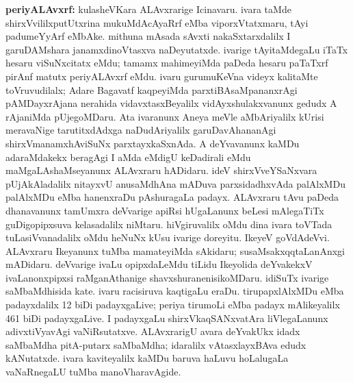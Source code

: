 {\large\textbf{periyALAvxrf:}} kulasheVKara ALAvxrarige Icinavaru. ivara taMde shirxVvililxputUtxrina mukuMdAcAyaRrf eMba viporxVtatxmaru, tAyi padumeYyArf eMbAke. mithuna mAsada sAvxti nakaSxtarxdalilx I garuDAMshara janamxdinoVtasxva naDeyutatxde. ivarige tAyitaMdegaLu iTaTx hesaru viSuNxcitatx eMdu; tamamx mahimeyiMda paDeda hesaru paTaTxrf pirAnf matutx periyALAvxrf eMdu. ivaru gurumuKeVna videyx kalitaMte toVruvudilalx; Adare Bagavatf kaqpeyiMda parxtiBAsaMpananxrAgi pAMDayxrAjana nerahida vidavxtasxBeyalilx vidAyxshulakxvanunx gedudx A rAjaniMda pUjegoMDaru. Ata ivaranunx Aneya meVle aMbAriyalilx kUrisi meravaNige tarutitxdAdxga naDudAriyalilx garuDavAhananAgi shirxVmanamxhAviSuNx parxtayxkaSxnAda. A deYvavanunx kaMDu adaraMdakekx beragAgi I aMda eMdigU keDadirali eMdu maMgaLAshaMseyanunx ALAvxraru hADidaru. ideV shirxVveYSaNxvara pUjAkAladalilx nitayxvU anusaMdhAna mADuva parxsidadhxvAda palAlxMDu palAlxMDu eMba hanenxraDu pAshuragaLa padayx. ALAvxraru tAvu paDeda dhanavanunx tamUmxra deVvarige apiRsi hUgaLanunx beLesi mAlegaTiTx guDigopipxsuva kelasadalilx niMtaru. hiVgiruvalilx oMdu dina ivara toVTada tuLasiVvanadalilx oMdu heNuNx kUsu ivarige doreyitu. IkeyeV goVdAdeVvi. ALAvxraru Ikeyanunx tuMba mamateyiMda sAkidaru; susaMsakxqqtaLanAnxgi mADidaru. deVvarige ivaLu opipxdaLeMdu tiLidu Ikeyolida deYvakekxV ivaLanonxpipxsi raMganAthanige shavxshuranenisikoMDaru. idiSuTx ivarige saMbaMdhisida kate. ivaru racisiruva kaqtigaLu eraDu. tirupapxlAlxMDu eMba padayxdalilx 12 biDi padayxgaLive; periya tirumoLi eMba padayx mAlikeyalilx 461 biDi padayxgaLive. I padayxgaLu shirxVkaqSANxvatAra liVlegaLanunx adivxtiVyavAgi vaNiRsutatxve. ALAvxrarigU avara deYvakUkx idadx saMbaMdha pitA-putarx saMbaMdha; idaralilx vAtasxlayxBAva edudx kANutatxde. ivara kaviteyalilx kaMDu baruva haLuvu hoLalugaLa vaNaRnegaLU tuMba manoVharavAgide.

